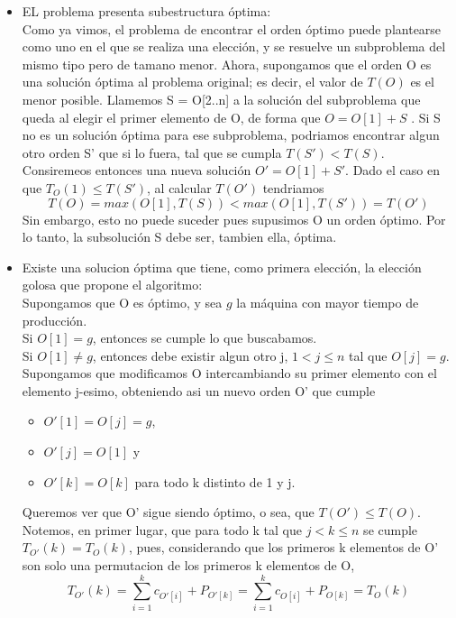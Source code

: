\begin{itemize}
    \item EL problema presenta subestructura \'optima:\\
        Como ya vimos, el problema de encontrar el orden \'optimo puede plantearse como uno en el que se realiza una elecci\'on, y se resuelve un subproblema 
        del mismo tipo pero de tamano menor. 
        Ahora, supongamos que el orden O es una soluci\'on \'optima al problema original; es decir, el valor de $T(O)$ es el menor posible.
        Llamemos S = O[2..n] a la soluci\'on del subproblema que queda al elegir el primer elemento de O, de forma que $O = O[1] + S$ . 
        Si S no es un soluci\'on \'optima para ese subproblema, podriamos encontrar algun otro orden S' que si lo fuera, tal que se cumpla $T(S') < T(S)$.
        Consiremeos entonces una nueva soluci\'on $O' = O[1] + S'$. 
        Dado el caso en que $T_{O}(1) \leq T(S')$, al calcular $T(O')$ tendriamos 
        $$T(O) = max(O[1], T(S)) < max(O[1], T(S')) = T(O')$$
        Sin embargo, esto no puede suceder pues supusimos O un orden \'optimo. Por lo tanto, la subsoluci\'on S debe ser, tambien ella, \'optima.

    \item Existe una solucion \'optima que tiene, como primera elecci\'on, la elecci\'on golosa que propone el algoritmo:\\
        Supongamos que O es \'optimo, y sea $g$ la m\'aquina con mayor tiempo de producci\'on.\\
        Si $O[1] = g$, entonces se cumple lo que buscabamos.\\
        Si $O[1] \not= g$, entonces debe existir algun otro j, $1 < j \leq n$ tal que $O[j] = g$.
        Supongamos que modificamos O intercambiando su primer elemento con el elemento j-esimo, obteniendo asi un
          nuevo orden O' que cumple
              \begin{itemize}
								\item $O'[1] = O[j] = g$, 
								\item $O'[j] = O[1]$ y
								\item $O'[k] = O[k]$ para todo k distinto de 1 y j.
							\end{itemize}
          
          Queremos ver que O' sigue siendo \'optimo, o sea, que $T(O') \leq T(O)$.
          Notemos, en primer lugar, que para todo k tal que $j < k \leq n$ se cumple $T_{O'}(k) =  T_{O}(k) $, pues, considerando que
          los primeros k elementos de O' son solo una permutacion de los primeros k elementos de O,
          $$ T_{O'}(k) = \sum_{i = 1}^{k}{c_{O'[i]}} + P_{O'[k]}
                                   = \sum_{i = 1}^{k}{c_{O[i]}} + P_{O[k]}
                                   = T_{O}(k)$$
          

\end{itemize}
